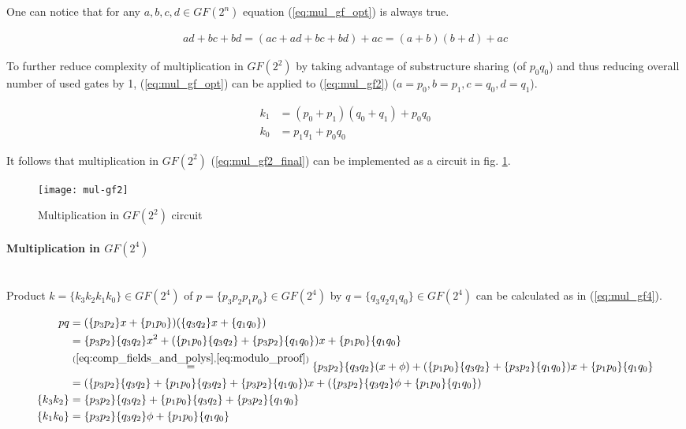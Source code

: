 One can notice that for any $a, b, c, d \in GF(2^n)$ equation (\ref{eq:mul_gf_opt}) is always true.

\begin{equation}
\label{eq:mul_gf_opt}
\begin{aligned}
ad + bc + bd = (ac + ad + bc + bd) + ac = (a + b)(b + d) + ac
\end{aligned}
\end{equation}

To further reduce complexity of multiplication in $GF(2^2)$ by taking advantage of substructure sharing (of $p_0q_0$) and thus reducing overall number of used gates by 1, (\ref{eq:mul_gf_opt}) can be applied to (\ref{eq:mul_gf2}) ($a = p_0, b = p_1, c = q_0, d = q_1$).

\begin{equation}
\label{eq:mul_gf2_final}
\begin{aligned}
k_1 &= (p_0 + p_1)(q_0 + q_1) + p_0q_0\\
k_0 &= p_1q_1 + p_0q_0
\end{aligned}
\end{equation}


It follows that multiplication in $GF(2^2)$ (\ref{eq:mul_gf2_final}) can be implemented as a circuit in fig. \ref{fig:mul_gf2}.

\begin{figure}[!h]
\centering
\texttt{[image: mul-gf2]}
\caption{Multiplication in $GF(2^2)$ circuit}
\label{fig:mul_gf2}
\end{figure}

\paragraph{Multiplication in $GF(2^4)$}\mbox{}\\
Product $k = \{k_3k_2k_1k_0\} \in GF(2^4)$ of $p = \{p_3p_2p_1p_0\} \in GF(2^4)$ by $q = \{q_3q_2q_1q_0\} \in GF(2^4)$ can be calculated as in (\ref{eq:mul_gf4}).

\begin{equation}
\label{eq:mul_gf4}
\begin{aligned}
pq &= (\{p_3p_2\}x + \{p_1p_0\})(\{q_3q_2\}x + \{q_1q_0\})\\
&= \{p_3p_2\}\{q_3q_2\}x^2 + (\{p_1p_0\}\{q_3q_2\} + \{p_3p_2\}\{q_1q_0\})x + \{p_1p_0\}\{q_1q_0\} \\
&\stackrel{(\ref{eq:comp_fields_and_polys}, \ref{eq:modulo_proof})}{=}
\{p_3p_2\}\{q_3q_2\}(x + \phi) + (\{p_1p_0\}\{q_3q_2\} + \{p_3p_2\}\{q_1q_0\})x + \{p_1p_0\}\{q_1q_0\} \\
&= (\{p_3p_2\}\{q_3q_2\} + \{p_1p_0\}\{q_3q_2\} + \{p_3p_2\}\{q_1q_0\})x + (\{p_3p_2\}\{q_3q_2\}\phi + \{p_1p_0\}\{q_1q_0\})\\
\{k_3k_2\} &= \{p_3p_2\}\{q_3q_2\} + \{p_1p_0\}\{q_3q_2\} + \{p_3p_2\}\{q_1q_0\}\\
\{k_1k_0\} &= \{p_3p_2\}\{q_3q_2\}\phi + \{p_1p_0\}\{q_1q_0\}
\end{aligned}
\end{equation}


